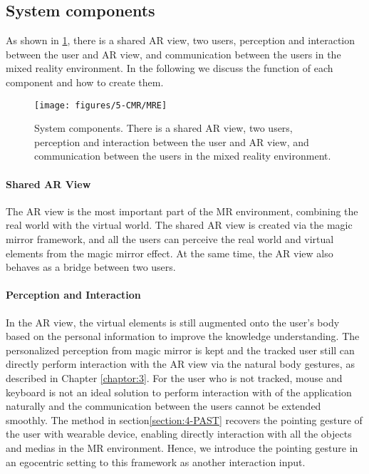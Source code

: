 \subsection{System components}
As shown in \figurename{\ref{fig:5:MRE}}, there is a shared AR view, two users, perception and interaction between the user and AR view, and communication between the users in the mixed reality environment. 
In the following we discuss the function of each component and how to create them.
\begin{figure} [htb]
\centering
\texttt{[image: figures/5-CMR/MRE]}
\caption{System components. There is a shared AR view, two users, perception and interaction between the user and AR view, and communication between the users in the mixed reality environment.}
\label{fig:5:MRE}
\end{figure}
\paragraph{Shared AR View} The AR view is the most important part of the MR environment, combining the real world with the virtual world. 
The shared AR view is created via the magic mirror framework, and all the users can perceive the real world and virtual elements from the magic mirror effect. 
At the same time, the AR view also behaves as a bridge between two users. 

\paragraph{Perception and Interaction}  
In the AR view, the virtual elements is still augmented onto the user's body based on the personal information to improve the knowledge understanding. The personalized perception from magic mirror is kept and the tracked user still can directly perform interaction with the AR view via the natural body gestures, as described in Chapter \ref{chaptor:3}. 
For the user who is not tracked, mouse and keyboard is not an ideal solution to perform interaction with of the application naturally and the communication between the users cannot be extended smoothly. 
The method in section\ref{section:4-PAST} recovers the pointing gesture of the user with wearable device, enabling directly interaction with all the objects and medias in the MR environment.
Hence, we introduce the pointing gesture in an egocentric setting to this framework as another interaction input.

